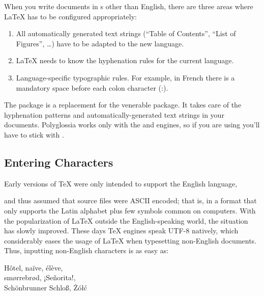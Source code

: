 When you write documents in s other than English, there are three
areas where \LaTeX{} has to be configured appropriately:

\begin{enumerate}
  \item All automatically generated text strings (\enquote{Table of Contents},
        \enquote{List of Figures}, \ldots) have to be adapted to the new
        language.
  \item \LaTeX{} needs to know the hyphenation rules for the current language.
  \item Language-specific typographic rules. For example, in French there is a
        mandatory space before each colon character (:).
\end{enumerate}

The package  is a replacement for the venerable 
package. It takes care of the hyphenation patterns and automatically-generated
text strings in your documents. Polyglossia works only with the 
and  engines, so if you are using  you'll have to
stick with .

\subsection{Entering Characters}

Early versions of \TeX{} were only intended to support the English language,

and thus assumed that source files were ASCII encoded; that is, in a format
that only supports the Latin alphabet plus few symbols common on computers. With
the popularization of \LaTeX{} outside the English-speaking world, the situation
has slowly improved. These days \TeX{} engines speak UTF-8 natively, which
considerably eases the usage of \LaTeX{} when typesetting non-English
documents. Thus, inputting non-English characters is as easy as:
\begin{chktexignore}
\begin{example}
  Hôtel, naïve, élève, \\
  smørrebrød, ¡Señorita!, \\
  Schönbrunner Schloß, Żółć
\end{example}
\end{chktexignore}


